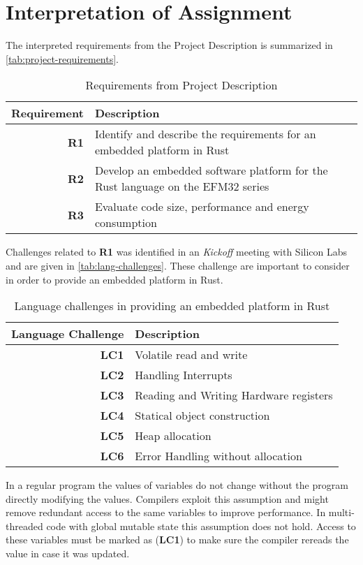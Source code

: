 \section{Interpretation of Assignment}

The interpreted requirements from the Project Description is summarized in \autoref{tab:project-requirements}.

\begin{table}[H]
  \centering
  \begin{tabular}{r | p{8cm}}
    \textbf{Requirement} & \textbf{Description} \\
    \hline
    \textbf{R1} & Identify and describe the requirements for an embedded platform in Rust \\
    \textbf{R2} & Develop an embedded software platform for the Rust language on the EFM32 series \\
    \textbf{R3} & Evaluate code size, performance and energy consumption \\
    \hline
  \end{tabular}
  \caption{Requirements from Project Description}
  \label{tab:project-requirements}
\end{table}

Challenges related to \textbf{R1} was identified in an \emph{Kickoff} meeting with Silicon Labs and are given in \autoref{tab:lang-challenges}.
These challenge are important to consider in order to provide an embedded platform in Rust.

\begin{table}[H]
  \centering
  \begin{tabular}{r | l}
    \textbf{Language Challenge} & \textbf{Description} \\
    \hline
    \textbf{LC1} & Volatile read and write \\
    \textbf{LC2} & Handling Interrupts \\
    \textbf{LC3} & Reading and Writing Hardware registers \\
    \textbf{LC4} & Statical object construction \\
    \textbf{LC5} & Heap allocation \\
    \textbf{LC6} & Error Handling without allocation \\
    \hline
  \end{tabular}
  \caption{Language challenges in providing an embedded platform in Rust}
  \label{tab:lang-challenges}
\end{table}

In a regular program the values of variables do not change without the program directly modifying the values.
Compilers exploit this assumption and might remove redundant access to the same variables to improve performance.
In multi-threaded code with global mutable state this assumption does not hold.
Access to these variables must be marked as  (\textbf{LC1}) to make sure the compiler rereads the value in case it was updated.

